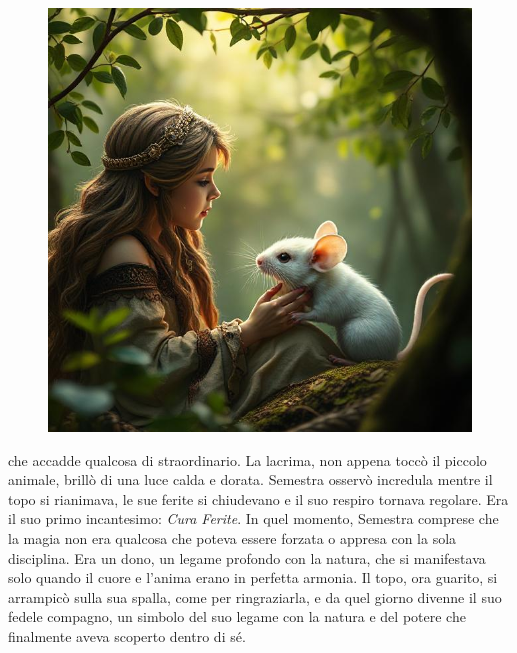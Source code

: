 \documentclass[letterpaper,twocolumn,openany,nodeprecatedcode]{dndbook}
\begin{document}
\begin{figure}[h!]
  \begin{tcolorbox}[
      enhanced,
      colframe=PhbTan,      %
      colback=white,
      opacityback=0,
      title={\vspace{0.2cm}\centering \sc  \textbf{Semestra e Larry}\vspace{0.2cm}},
      colbacktitle=PhbTan!50!PhbLightCyan,
      coltitle=black,
      fonttitle=\bfseries
  ]
  \includegraphics[width=\textwidth]{img/semestra_larry-1.jpeg}
  \label{fig:semestra-larry}
  \end{tcolorbox}
\end{figure}

 che accadde qualcosa di straordinario. La lacrima, non appena toccò 
il piccolo animale, brillò di una luce calda e dorata. Semestra osservò incredula mentre il topo 
si rianimava, le sue ferite si chiudevano e il suo respiro tornava regolare. Era il suo primo 
incantesimo: \textit{Cura Ferite}. In quel momento, Semestra comprese che la magia non era qualcosa che poteva essere forzata o appresa con la sola disciplina. Era un dono, un legame profondo con la natura, che si manifestava solo quando il cuore e l’anima erano in perfetta armonia. Il topo, ora guarito, si arrampicò sulla sua spalla, come per ringraziarla, e da quel giorno divenne il suo fedele compagno, un simbolo del suo legame con la natura e del potere che finalmente aveva scoperto dentro di sé.
\end{document}
